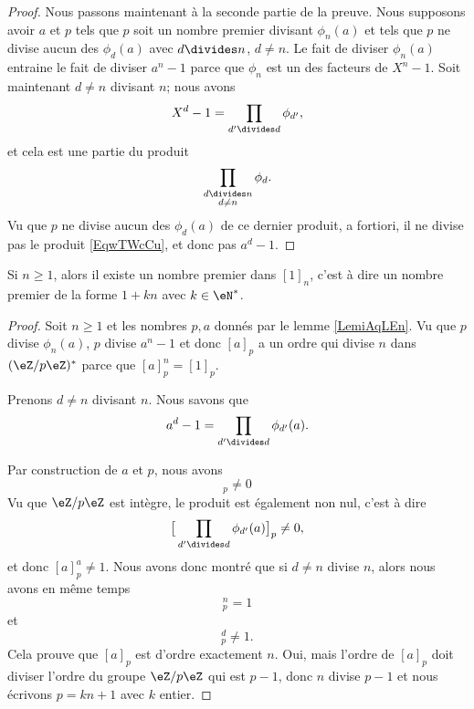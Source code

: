 \begin{proof}
    Nous passons maintenant à la seconde partie de la preuve. Nous supposons avoir \( a\) et \( p\) tels que \( p\) soit un nombre premier divisant \( \phi_n(a)\) et tels que \( p\) ne divise aucun des \( \phi_d(a)\) avec \( d\divides n\), \( d\neq n\). Le fait de diviser \( \phi_n(a)\) entraine le fait de diviser \( a^n-1\) parce que \( \phi_n\) est un des facteurs de \( X^n-1\). Soit maintenant \( d\neq n\) divisant \( n\); nous avons
    \begin{equation}    \label{EqwTWcCu}
        X^d-1=\prod_{d'\divides d}\phi_{d'},
    \end{equation}
    et cela est une partie du produit
    \begin{equation}
        \prod_{\substack{d\divides n\\d\neq n}}\phi_d.
    \end{equation}
    Vu que \( p\) ne divise aucun des \( \phi_d(a)\) de ce dernier produit, a fortiori, il ne divise pas le produit \ref{EqwTWcCu}, et donc pas \( a^d-1\).
\end{proof}

\begin{lemma}       \label{LemrZnmpG}
    Si \( n\geq 1\), alors il existe un nombre premier dans \( [1]_n\), c'est à dire un nombre premier de la forme \( 1+kn\) avec \( k\in \eN^*\). 
\end{lemma}

\begin{proof}
    Soit \( n\geq 1\) et les nombres \( p,a\) donnés par le lemme \ref{LemiAqLEn}. Vu que \( p\) divise \( \phi_n(a)\), \( p\) divise \( a^n-1\) et donc \( [a]_p\) a un ordre qui divise \( n\) dans \( (\eZ/p\eZ)^*\) parce que \( [a]_p^n=[1]_p\).

    Prenons \( d\neq n\) divisant \( n\). Nous savons que
    \begin{equation}
        a^d-1=\prod_{d'\divides d}\phi_{d'}(a).
    \end{equation}
    
    Par construction de \( a\) et \( p\), nous avons
    \begin{equation}
        [\phi_{d'}(a)]_p\neq 0
    \end{equation}
    Vu que \( \eZ/p\eZ\) est intègre, le produit est également non nul, c'est à dire
    \begin{equation}
        \big[ \prod_{d'\divides d}\phi_{d'}(a) \big]_p\neq 0,
    \end{equation}
    et donc \( [a]_p^a\neq 1\). Nous avons donc montré que si \( d\neq n\) divise \( n\), alors nous avons en même temps
    \begin{equation}
        [a]_p^n=1
    \end{equation}
    et
    \begin{equation}
        [a]_p^d\neq 1.
    \end{equation}
    Cela prouve que \( [a]_p\) est d'ordre exactement \( n\). Oui, mais l'ordre de \( [a]_p\) doit diviser l'ordre du groupe \( \eZ/p\eZ\) qui est \( p-1\), donc \( n\) divise \( p-1\) et nous écrivons \( p=kn+1\) avec \( k\) entier.
\end{proof}

